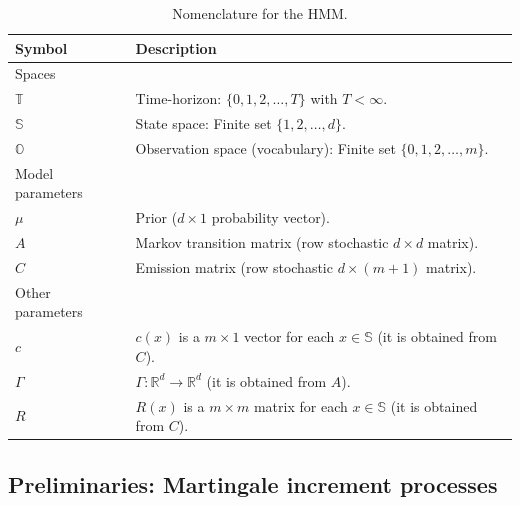 \documentclass[twoside,11pt]{article}
\def\Re{\mathbb{R}}
\newcommand{\field}[1]{\mathbb{#1}}
\def\Re{\field{R}}
\def\bS{\begin{slide}}
\def\Re{\mathbb{R}}
\renewcommand{\Re}{\mathbb{R}}
\def\bS{\mathbb{S}}
\def\bO{\mathbb{O}}
\begin{document}
\begin{table}[t]
  \begin{tabularx}{\textwidth}{l l}
    \toprule
    Symbol & Description \\
    \midrule
    Spaces & \\
    $\mathbb{T}$ & Time-horizon: $\{0,1,2,\hdots,T\}$ with $T<\infty$. \\
    $\bS$ & State space: Finite set $\{1,2,\hdots,d\}$. \\
    $\bO$ & Observation space (vocabulary): Finite set $\{0,1,2,\hdots,m\}$. \\
    \midrule 
    Model parameters & \\
    $\mu$ & Prior ($d\times 1$ probability vector). \\
    $A$ & Markov transition matrix (row stochastic $d\times d$ matrix). \\
    $C$ & Emission matrix (row stochastic $d\times (m+1)$ matrix). \\
      \midrule 
    Other parameters & \\
    $c$ & $c(x)$ is a $m\times 1$ vector for each $x\in\bS$ (it is obtained
          from $C$). \\
    $\Gamma$ & $\Gamma:\Re^d\to\Re^d$ (it is obtained
          from $A$).\\
    $R$ & $R(x)$ is a $m\times m$ matrix for each $x\in\bS$  (it is obtained
          from $C$).\\
    \bottomrule
  \end{tabularx}
  \vspace*{-10pt}
  \caption{Nomenclature for the HMM.}
  \label{tab:n_hmmx}
  \vspace*{-10pt}
\end{table}



\subsection{Preliminaries: Martingale increment processes}
\label{sec:prelim_mg}
\end{document}

